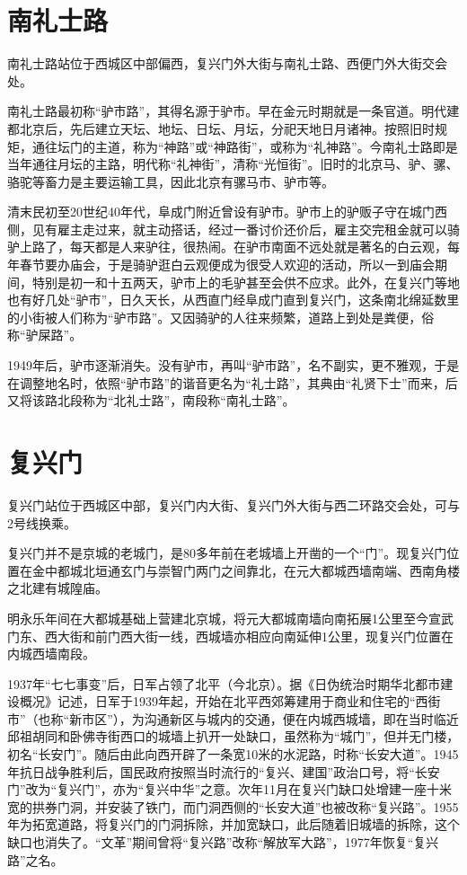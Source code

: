 \section{南礼士路}
南礼士路站位于西城区中部偏西，复兴门外大街与南礼士路、西便门外大街交会处。

南礼士路最初称“驴市路”，其得名源于驴市。早在金元时期就是一条官道。明代建都北京后，先后建立天坛、地坛、日坛、月坛，分祀天地日月诸神。按照旧时规矩，通往坛门的主道，称为“神路”或“神路街”，或称为“礼神路”。今南礼士路即是当年通往月坛的主路，明代称“礼神街”，清称“光恒街”。旧时的北京马、驴、骡、骆驼等畜力是主要运输工具，因此北京有骡马市、驴市等。

清末民初至20世纪40年代，阜成门附近曾设有驴市。驴市上的驴贩子守在城门西侧，见有雇主走过来，就主动搭话，经过一番讨价还价后，雇主交完租金就可以骑驴上路了，每天都是人来驴往，很热闹。在驴市南面不远处就是著名的白云观，每年春节要办庙会，于是骑驴逛白云观便成为很受人欢迎的活动，所以一到庙会期间，特别是初一和十五两天，驴市上的毛驴甚至会供不应求。此外，在复兴门等地也有好几处“驴市”，日久天长，从西直门经阜成门直到复兴门，这条南北绵延数里的小街被人们称为“驴市路”。又因骑驴的人往来频繁，道路上到处是粪便，俗称“驴屎路”。

1949年后，驴市逐渐消失。没有驴市，再叫“驴市路”，名不副实，更不雅观，于是在调整地名时，依照“驴市路”的谐音更名为“礼士路”，其典由“礼贤下士”而来，后又将该路北段称为“北礼士路”，南段称“南礼士路”。

\section{复兴门}
复兴门站位于西城区中部，复兴门内大街、复兴门外大街与西二环路交会处，可与2号线换乘。

复兴门并不是京城的老城门，是80多年前在老城墙上开凿的一个“门”。现复兴门位置在金中都城北垣通玄门与崇智门两门之间靠北，在元大都城西墙南端、西南角楼之北建有城隍庙。

明永乐年间在大都城基础上营建北京城，将元大都城南墙向南拓展1公里至今宣武门东、西大街和前门西大街一线，西城墙亦相应向南延伸1公里，现复兴门位置在内城西墙南段。

1937年“七七事变”后，日军占领了北平（今北京）。据《日伪统治时期华北都市建设概况》记述，日军于1939年起，开始在北平西郊筹建用于商业和住宅的“西街市”（也称“新市区”），为沟通新区与城内的交通，便在内城西城墙，即在当时临近邱祖胡同和卧佛寺街西口的城墙上扒开一处缺口，虽然称为“城门”，但并无门楼，初名“长安门”。随后由此向西开辟了一条宽10米的水泥路，时称“长安大道”。1945年抗日战争胜利后，国民政府按照当时流行的“复兴、建国”政治口号，将“长安门”改为“复兴门”，亦为“复兴中华”之意。次年11月在复兴门缺口处增建一座十米宽的拱券门洞，并安装了铁门，而门洞西侧的“长安大道”也被改称“复兴路”。1955年为拓宽道路，将复兴门的门洞拆除，并加宽缺口，此后随着旧城墙的拆除，这个缺口也消失了。“文革”期间曾将“复兴路”改称“解放军大路”，1977年恢复“复兴路”之名。


